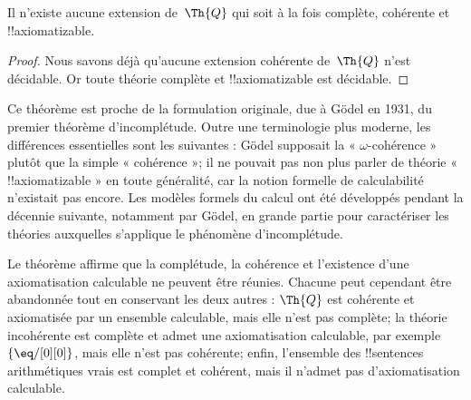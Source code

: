 \documentclass[../../../include/open-logic-section]{subfiles}
\begin{document}


\begin{thm}
Il n'existe aucune extension de~$\Th{Q}$ qui soit
à la fois complète, cohérente et !!{axiomatizable}.
\end{thm}

\begin{proof}
Nous savons déjà qu'aucune extension cohérente
de~$\Th{Q}$ n'est décidable. Or toute théorie
complète et !!{axiomatizable} est décidable.
\end{proof}

\begin{explain}
Ce théorème est proche de la formulation originale,
due à Gödel en 1931, du premier théorème
d'incomplétude. Outre une terminologie plus moderne,
les différences essentielles sont les suivantes :
Gödel supposait la « $\omega$-cohérence » plutôt que
la simple « cohérence »; il ne pouvait pas non plus
parler de théorie « !!{axiomatizable} » en toute
généralité, car la notion formelle de calculabilité
n'existait pas encore. Les modèles formels du calcul
ont été développés pendant la décennie suivante,
notamment par Gödel, en grande partie pour
caractériser les théories auxquelles s'applique
le phénomène d'incomplétude.

Le théorème affirme que la complétude, la cohérence
et l'existence d'une axiomatisation calculable ne
peuvent être réunies. Chacune peut cependant être
abandonnée tout en conservant les deux autres :
$\Th{Q}$ est cohérente et axiomatisée par un ensemble
calculable, mais elle n'est pas complète; la théorie
incohérente est complète et admet une axiomatisation
calculable, par exemple $\{\eq/[0][0]\}$, mais elle
n'est pas cohérente; enfin, l'ensemble des
!!{sentence}s arithmétiques vrais est complet et
cohérent, mais il n'admet pas d'axiomatisation
calculable.
\end{explain}
\end{document}
